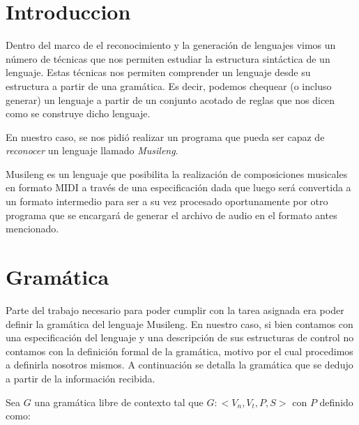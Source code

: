 \section{Introduccion}

Dentro del marco de el reconocimiento y la generación de lenguajes vimos un número de técnicas que nos permiten
estudiar la estructura sintáctica de un lenguaje. Estas técnicas nos permiten
comprender un lenguaje desde su estructura a partir de una gramática. Es decir, podemos chequear (o incluso generar)
un lenguaje a partir de un conjunto acotado de reglas que nos dicen como se construye dicho lenguaje.

En nuestro caso, se nos pidió realizar un programa que pueda ser capaz de \emph{reconocer} un lenguaje llamado \emph{Musileng}.

Musileng es un lenguaje que posibilita la realización de composiciones musicales en formato MIDI a través de una especificación dada que luego
será convertida a un formato intermedio para ser a su vez procesado oportunamente por otro programa que se encargará de generar el archivo
de audio en el formato antes mencionado.

\section{Gramática}

Parte del trabajo necesario para poder cumplir con la tarea asignada era poder definir la gramática del lenguaje Musileng.
En nuestro caso, si bien contamos con una especificación del lenguaje y una descripción de sus estructuras de control no contamos con la definición
formal de la gramática, motivo por el cual procedimos a definirla nosotros mismos. A continuación se detalla la gramática que
se dedujo a partir de la información recibida.

Sea $G$ una gramática libre de contexto tal que $G: <V_n, V_t, P, S>$ con $P$ definido como: 

